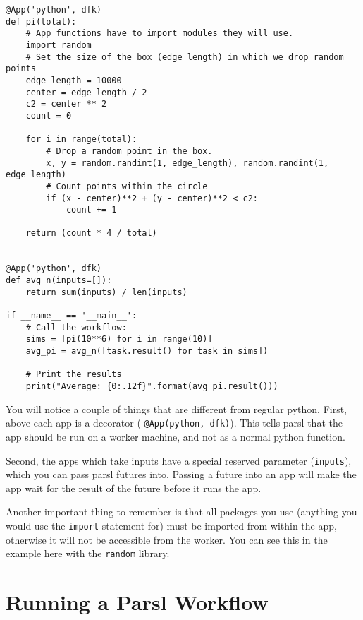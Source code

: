 \documentclass[]{book}
\begin{document}
\begin{verbatim}
@App('python', dfk)
def pi(total):
    # App functions have to import modules they will use.                                            
    import random
    # Set the size of the box (edge length) in which we drop random points                           
    edge_length = 10000
    center = edge_length / 2
    c2 = center ** 2
    count = 0

    for i in range(total):
        # Drop a random point in the box.                                                            
        x, y = random.randint(1, edge_length), random.randint(1, edge_length)
        # Count points within the circle                                                             
        if (x - center)**2 + (y - center)**2 < c2:
            count += 1

    return (count * 4 / total)


@App('python', dfk)
def avg_n(inputs=[]):
    return sum(inputs) / len(inputs)

if __name__ == '__main__':
    # Call the workflow:                                                                                 
    sims = [pi(10**6) for i in range(10)]
    avg_pi = avg_n([task.result() for task in sims])

    # Print the results                                                                                  
    print("Average: {0:.12f}".format(avg_pi.result()))
\end{verbatim}

You will notice a couple of things that are different from regular
python. First, above each app is a decorator (
\texttt{@App(\textquotesingle{}python\textquotesingle{},\ dfk)}). This
tells parsl that the app should be run on a worker machine, and not as a
normal python function.

Second, the apps which take inputs have a special reserved parameter
(\texttt{inputs}), which you can pass parsl futures into. Passing a
future into an app will make the app wait for the result of the future
before it runs the app.

Another important thing to remember is that all packages you use
(anything you would use the \texttt{import} statement for) must be
imported from within the app, otherwise it will not be accessible from
the worker. You can see this in the example here with the
\texttt{random} library.

\section{Running a Parsl Workflow}\label{running-a-parsl-workflow}
\end{document}
